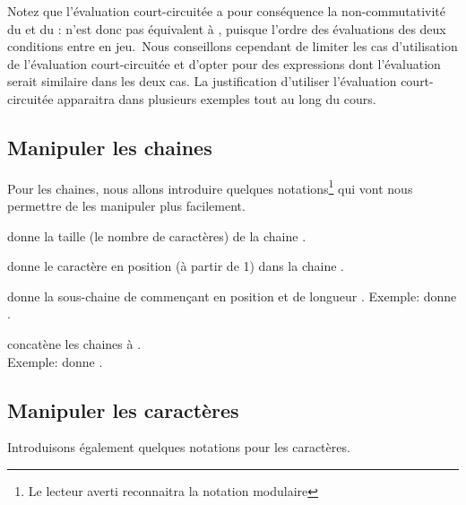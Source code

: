 			Notez que l’évaluation court-circuitée a pour conséquence la
			non-commutativité du  et du
			:  n’est donc
			pas équivalent à , puisque l’ordre
			des évaluations des deux conditions entre en jeu.~Nous conseillons
			cependant de limiter les cas d’utilisation de l’évaluation
			court-circuitée et d’opter pour des expressions dont
			l’évaluation serait similaire dans les deux cas. La justification
			d’utiliser l’évaluation court-circuitée apparaitra dans plusieurs
			exemples tout au long du cours.
	
		\subsection{Manipuler les chaines}
		
			Pour les chaines, nous allons introduire quelques notations\footnote{
			Le lecteur averti reconnaitra la notation modulaire}
			qui vont nous permettre de les manipuler plus facilement.
		
			\begin{liste}
			\item 
				donne la taille (le nombre de caractères) de la chaine 
				.
			\item 
				donne le caractère en position  
				(à partir de 1) dans la chaine .
			\item{}
				donne la sous-chaine de 
				commençant en position 
				et de longueur .
				Exemple: 
				 donne .
			\item 
				concatène les chaines  
				à .
				\\
				Exemple:
				 donne .
			\end{liste}
			

		\subsection{Manipuler les caractères}

			Introduisons également quelques notations pour les caractères.


